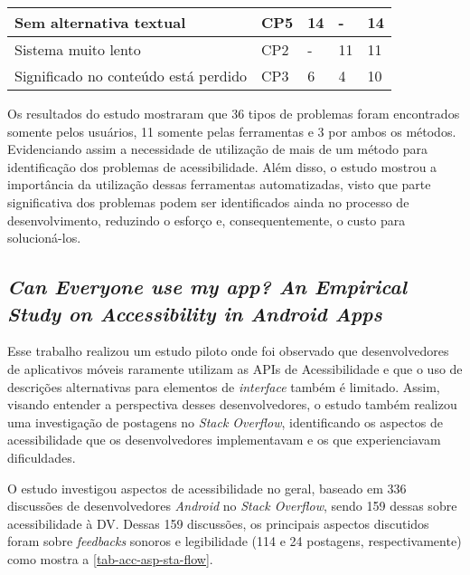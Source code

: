 \begin{table}[htb]
\begin{center}
\begin{tabular}{p{10.5cm}|p{1.4cm}|p{0.6cm}|p{0.6cm}|p{0.7cm}}
      \hline
      Sem alternativa textual                                                 & CP5                & 14           & -            & 14             \\
      \hline
      Sistema muito lento                                                     & CP2                & -            & 11           & 11             \\
      \hline
      Significado no conteúdo está perdido                                    & CP3                & 6            & 4            & 10             \\
    \end{tabular}
  \end{center}
\end{table}

Os resultados do estudo mostraram que 36 tipos de problemas foram encontrados somente pelos usuários, 11 somente pelas ferramentas e 3 por ambos os métodos.
Evidenciando assim a necessidade de utilização de mais de um método para identificação dos problemas de acessibilidade.
Além disso, o estudo mostrou a importância da utilização dessas ferramentas automatizadas, visto que parte significativa dos problemas podem ser identificados ainda no processo de desenvolvimento, reduzindo o esforço e, consequentemente, o custo para solucioná-los.

\subsection{\emph{Can Everyone use my app? An Empirical Study on Accessibility in Android Apps}}

Esse trabalho realizou um estudo piloto onde foi observado que desenvolvedores de aplicativos móveis raramente utilizam as APIs de Acessibilidade e que o uso de descrições alternativas para elementos de \emph{interface} também é limitado.
Assim, visando entender a perspectiva desses desenvolvedores, o estudo também realizou uma investigação de postagens no \emph{Stack Overflow}, identificando os aspectos de acessibilidade que os desenvolvedores implementavam e os que experienciavam dificuldades.

O estudo investigou aspectos de acessibilidade no geral, baseado em 336 discussões de desenvolvedores \emph{Android} no \emph{Stack Overflow}, sendo 159 dessas sobre acessibilidade à DV\@.
Dessas 159 discussões, os principais aspectos discutidos foram sobre \emph{feedbacks} sonoros e legibilidade (114 e 24 postagens, respectivamente) como mostra a \autoref{tab-acc-asp-sta-flow}.

